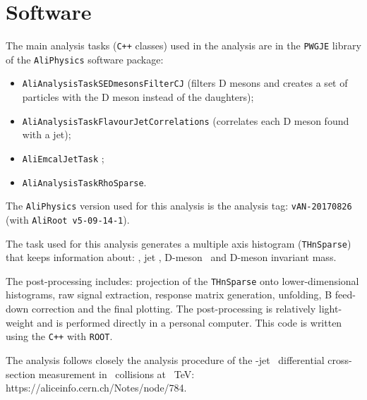\section{Software}

The main analysis tasks (\texttt{C++} classes) used in the analysis are in the \texttt{PWGJE} library of the \texttt{AliPhysics} software package:
\begin{itemize}
\item \texttt{AliAnalysisTaskSEDmesonsFilterCJ} (filters D mesons and creates a set of particles with the D meson instead of the daughters);
\item \texttt{AliAnalysisTaskFlavourJetCorrelations} (correlates each D meson found with a jet);
\item \texttt{AliEmcalJetTask} ;%
\item \texttt{AliAnalysisTaskRhoSparse}. %
\end{itemize}
The \texttt{AliPhysics} version used for this analysis is the analysis tag: \texttt{vAN-20170826} (with \texttt{AliRoot v5-09-14-1}).%

The task used for this analysis generates a multiple axis histogram (\texttt{THnSparse}) that keeps information about: \zpar, jet \pt, D-meson \pt\ and D-meson invariant mass.

The post-processing includes: projection of the \texttt{THnSparse} onto lower-dimensional histograms, raw signal extraction, response matrix generation, unfolding, B feed-down correction and the final plotting.
The post-processing is relatively light-weight and is performed directly in a personal computer. This code is written using the \texttt{C++} with \texttt{ROOT}.

The analysis follows closely the analysis procedure of the \Dzero-jet \pt\ differential cross-section measurement in \pPb\ collisions at ~TeV: https://aliceinfo.cern.ch/Notes/node/784.

%


